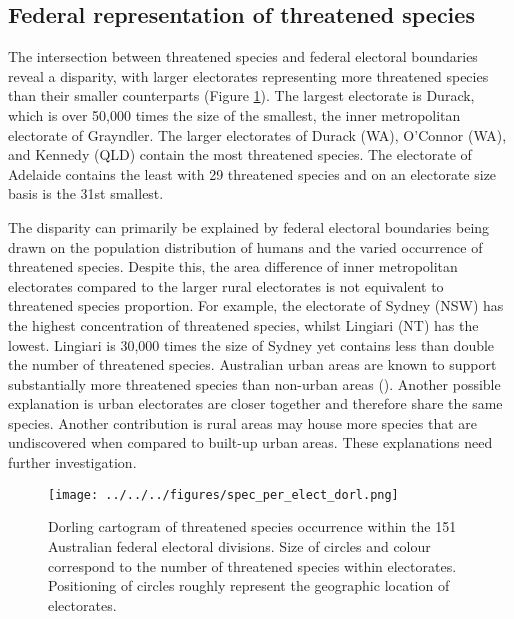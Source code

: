 \documentclass[a4paper,11pt]{article}
\begin{document}
\subsection{Federal representation of threatened species}
The intersection between threatened species and federal electoral boundaries reveal a disparity, with larger electorates representing more threatened species than their smaller counterparts (Figure \ref{fig:dorl}). The largest electorate is Durack, which is over 50,000 times the size of the smallest, the inner metropolitan electorate of Grayndler. The larger electorates of Durack (WA), O'Connor (WA), and Kennedy (QLD) contain the most threatened species. The electorate of Adelaide contains the least with 29 threatened species and on an electorate size basis is the 31st smallest. 

The disparity can primarily be explained by federal electoral boundaries being drawn on the population distribution of humans and the varied occurrence of threatened species. Despite this, the area difference of inner metropolitan electorates compared to the larger rural electorates is not equivalent to threatened species proportion. For example, the electorate of Sydney (NSW) has the highest concentration of threatened species, whilst Lingiari (NT) has the lowest. Lingiari is 30,000 times the size of Sydney yet contains less than double the number of threatened species. Australian urban areas are known to support substantially more threatened species than non-urban areas (\cite{ivesCitiesAreHotspots2016, soanesConservationOpportunitiesThreatened2020}). Another possible explanation is urban electorates are closer together and therefore share the same species. Another contribution is rural areas may house more species that are undiscovered when compared to built-up urban areas. These explanations need further investigation.

\begin{figure}[H]
	\centering
    \texttt{[image: ../../../figures/spec\_per\_elect\_dorl.png]}
    \caption{Dorling cartogram of threatened species occurrence within the 151 Australian federal electoral divisions. Size of circles and colour correspond to the number of threatened species within electorates. Positioning of circles roughly represent the geographic location of electorates.}
    \label{fig:dorl}
\end{figure}
\end{document}
